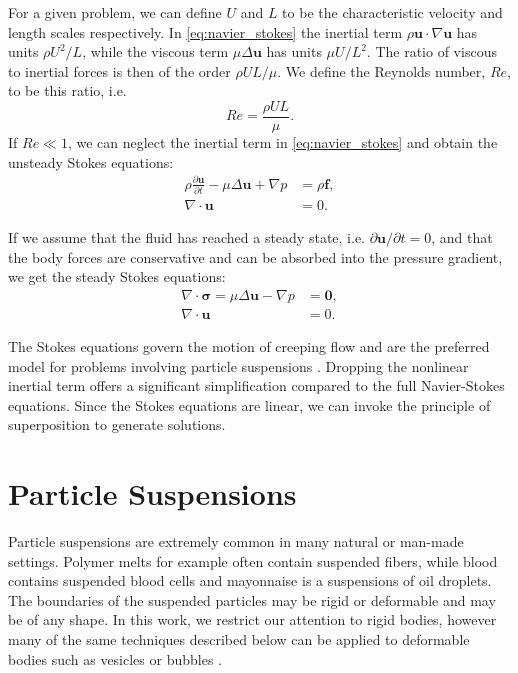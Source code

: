 For a given problem, we can define $U$ and $L$ to be the characteristic velocity and length scales respectively. In \eqref{eq:navier_stokes} the inertial term $\rho\mathbf{u}\cdot\nabla\mathbf{u}$ has units $\rho U^2/L$, while the viscous term $\mu\Delta\mathbf{u}$ has units $\mu U/L^2$. The ratio of viscous to inertial forces is then of the order $\rho U L/\mu$. We define the Reynolds number, $Re$, to be this ratio, i.e. 
\[ Re = \frac{\rho UL}{\mu}.\]
If  $Re\ll 1$, we can neglect the inertial term in \eqref{eq:navier_stokes} and obtain the unsteady Stokes equations:
\begin{align*}
	  \rho\frac{\partial \mathbf{u}}{\partial t} - \mu\Delta\mathbf{u} + \nabla p &= \rho\mathbf{f},\\
	\nabla\cdot\mathbf{u} &= 0.
\end{align*}

If we assume that the fluid has reached a steady state, i.e. $\partial\mathbf{u}/\partial t = 0$, and that the body forces are conservative and can be absorbed into the pressure gradient, we get the steady Stokes equations:
\begin{subequations}\label{eq:stokes_steady}
\begin{align}
	\nabla\cdot\pmb{\sigma} = \mu\Delta\mathbf{u} - \nabla p &= \mathbf{0},\\
	\nabla\cdot\mathbf{u} &= 0.
\end{align}
\end{subequations}

The Stokes equations govern the motion of creeping flow and are the preferred model for problems involving particle suspensions \cite{Karrila1991}. Dropping the nonlinear inertial term offers a significant simplification compared to the full Navier-Stokes equations. Since the Stokes equations are linear, we can invoke the principle of superposition to generate solutions. 

\section{Particle Suspensions}

Particle suspensions are extremely common in many natural or man-made settings. Polymer melts for example often contain suspended fibers, while blood contains suspended blood cells and mayonnaise is a suspensions of oil droplets. The boundaries of the suspended particles may be rigid or deformable and may be of any shape. In this work, we restrict our attention to rigid bodies, however many of the same techniques described below can be applied to deformable bodies such as vesicles or bubbles \cite{Villa2014, Rahimian2010}.

